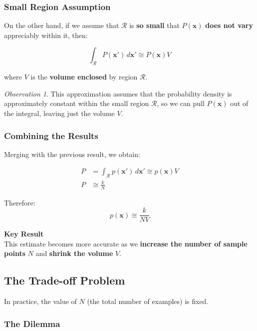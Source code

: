 \documentclass[11pt,a4paper]{article}
\theoremstyle{definition}
\theoremstyle{plain}
\theoremstyle{remark}
\newtheorem*{observation}{Observation}
\begin{document}
\subsubsection{Small Region Assumption}

On the other hand, if we assume that $\mathcal{R}$ is \textbf{so small} that $P(\mathbf{x})$ \textbf{does not vary} appreciably within it, then:

\[
\int_{\mathcal{R}} P(\mathbf{x}') \, d\mathbf{x}' \cong P(\mathbf{x}) V
\]

where $V$ is the \textbf{volume enclosed} by region $\mathcal{R}$.

\begin{observation}
This approximation assumes that the probability density is approximately constant within the small region $\mathcal{R}$, so we can pull $P(\mathbf{x})$ out of the integral, leaving just the volume $V$.
\end{observation}

\subsubsection{Combining the Results}

Merging with the previous result, we obtain:

\begin{align}
P &= \int_{\mathcal{R}} p(\mathbf{x}') \, d\mathbf{x}' \cong p(\mathbf{x}) V \\
P &\cong \frac{k}{N}
\end{align}

Therefore:
\[
p(\mathbf{x}) \cong \frac{k}{NV}
\]

\begin{center}
\colorbox{green!15}{\parbox{0.9\textwidth}{
\centering
\textbf{Key Result}\\[0.2cm]
This estimate becomes more accurate as we \textbf{increase the number of sample points} $N$ and \textbf{shrink the volume} $V$.
}}
\end{center}

\subsection{The Trade-off Problem}

In practice, the value of $N$ (the total number of examples) is fixed.

\subsubsection{The Dilemma}
\end{document}

